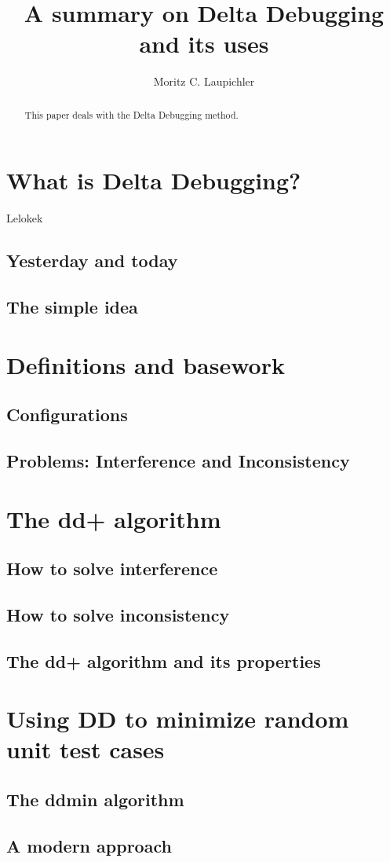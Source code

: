 \documentclass[a4paper,UKenglish]{lipics-v2018}
\title{A summary on Delta Debugging and its uses}
\author{Moritz C. Laupichler}{Fakultät für Informatik, Karlsruhe Institute of Technology, Germany}{moritz.laupichler@student.kit.edu}{}{}
\begin{document}
\maketitle

\begin{abstract}
	This paper deals with the Delta Debugging method.
\end{abstract}
	
\section{What is Delta Debugging?}
Lelokek
\subsection{Yesterday and today}
\subsection{The simple idea}

\section{Definitions and basework}
\subsection{Configurations}
\subsection{Problems: Interference and Inconsistency}

\section{The dd+ algorithm}
\subsection{How to solve interference}
\subsection{How to solve inconsistency}
\subsection{The dd+ algorithm and its properties}

\section{Using DD to minimize random unit test cases}
\subsection{The ddmin algorithm}
\subsection{A modern approach}
\end{document}
